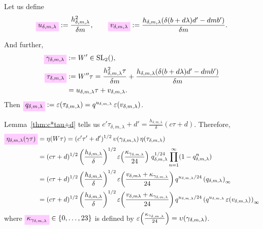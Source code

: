 \documentclass{article}
\begin{document}
Let us define
\begin{gather}
  \defineNotation[u-delta-m-lambda]{u_{\delta,m,\lambda}}
  :=
  \frac{h_{\delta,m,\lambda}^2}{\delta m},
  \qquad
  \defineNotation[v-delta-m-lambda]{v_{\delta,m,\lambda}}
  :=
  \frac{h_{\delta,m,\lambda}(\delta (b + d \lambda) d' - d m b')}{\delta m}.
  \label{eq:uv_delta-m-lambda}
\end{gather}

And further,
\begin{align}
  \defineNotation[gamma-delta-m-lambda]{\gamma_{\delta,m,\lambda}}
  &:=
    W'\in\SL2Z,
    \label{eq:gamma_delta-m-lambda}
  \\
  \defineNotation[tau-delta-m-lambda]{\tau_{\delta,m,\lambda}}
  &:=
    W''\tau
    = \frac{h_{\delta,m,\lambda}^2 \tau}{\delta m} +
    \frac{h_{\delta,m,\lambda}(\delta (b + d \lambda) d' - d m
    b')}{\delta m}
  \notag\\
    &= u_{\delta,m,\lambda} \tau + v_{\delta,m,\lambda}.
  \label{eq:tau_delta-m-lambda}
\end{align}
Then
$\defineNotation[q-delta-m-lambda]{q_{\delta,m,\lambda}} :=
\unityPower{\tau_{\delta,m,\lambda}} =
q^{u_{\delta,m,\lambda}}\,\unityPower{v_{\delta,m,\lambda}}$.


Lemma~\ref{thm:c*tau+d} tells us
$c'\tau_{\delta,m,\lambda}+d' = \frac{h_{\delta,m,\lambda}}{\delta} (c \tau + d)$.
%
Therefore,
\begin{align}
  \defineNotation[eta_delta-m-lambda-gamma-tau]{\eta_{\delta,m,\lambda}(\gamma \tau)}
  &= \eta(W \tau)
    = (c'\tau'+d')^{1/2} \, \upsilon(\gamma_{\delta,m,\lambda})
    \,\eta(\tau_{\delta,m,\lambda})\notag\\
  &=
    (c\tau+d)^{1/2}
    \left(\frac{h_{\delta,m,\lambda}}{\delta}\right)^{1/2}
    \unityPower{\frac{\kappa_{\gamma_{\delta,m,\lambda}}}{24}} \,
    q_{\delta,m,\lambda}^{1/24}
    \prod_{n=1}^\infty (1-q_{\delta,m,\lambda}^n)\notag\\
  &=
    (c\tau+d)^{1/2}
    \left(\frac{h_{\delta,m,\lambda}}{\delta}\right)^{1/2}
    \unityPower{\frac{ v_{\delta,m\lambda} + \kappa_{\gamma_{\delta,m,\lambda}}}{24}}
    q^{u_{\delta,m,\lambda}/24}
    \eulerFunction[q_{\delta,m,\lambda}]{}\notag\\
  &=
    (c\tau+d)^{1/2}
    \left(\frac{h_{\delta,m,\lambda}}{\delta}\right)^{1/2}
    \unityPower{\frac{ v_{\delta,m\lambda} + \kappa_{\gamma_{\delta,m,\lambda}}}{24}}
    q^{u_{\delta,m,\lambda}/24}
    \eulerFunction[q^{u_{\delta,m,\lambda}}\,\unityPower{v_{\delta,m,\lambda}}]{}
    \label{eq:eta_delta-m-lambda(gamma*tau)}
\end{align}
where
$\defineNotation[kappa-gamma-delta-m-lambda]{\kappa_{\gamma_{\delta,m,\lambda}}}
\in \Set{0,\ldots,23}$ is defined by
$\varepsilon\!\left(\frac{\kappa_{\gamma_{\delta,m,\lambda}}}{24}\right) =
\upsilon(\gamma_{\delta,m,\lambda})$.
\end{document}

